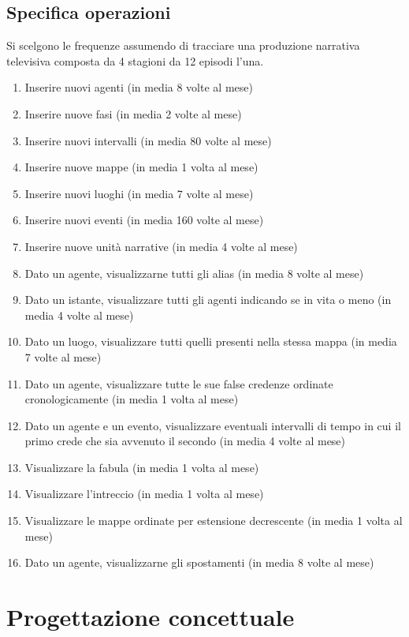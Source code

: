 \documentclass{article}
\begin{document}
\subsection{Specifica operazioni}
Si scelgono le frequenze assumendo di tracciare una produzione narrativa
televisiva composta da 4 stagioni da 12 episodi l'una.
\begin{enumerate}
	\item Inserire nuovi agenti (in media 8 volte al mese)
	\item Inserire nuove fasi (in media 2 volte al mese)
	\item Inserire nuovi intervalli (in media 80 volte al mese)
	\item Inserire nuove mappe (in media 1 volta al mese)
	\item Inserire nuovi luoghi (in media 7 volte al mese)
	\item Inserire nuovi eventi (in media 160 volte al mese)
	\item Inserire nuove unità narrative (in media 4 volte al mese)
	\item Dato un agente, visualizzarne tutti gli alias (in media 8 volte al
	      mese)
	\item Dato un istante, visualizzare tutti gli agenti indicando se in vita o
	      meno (in media 4 volte al mese)
	\item Dato un luogo, visualizzare tutti quelli presenti nella stessa mappa (in
	      media 7 volte al mese)
	\item Dato un agente, visualizzare tutte le sue false credenze ordinate
	      cronologicamente (in media 1 volta al mese)
	\item Dato un agente e un evento, visualizzare eventuali intervalli di
	      tempo in cui il primo crede che sia avvenuto il secondo (in media 4
	      volte al mese)
	\item Visualizzare la fabula (in media 1 volta al mese)
	\item Visualizzare l'intreccio (in media 1 volta al mese)
	\item Visualizzare le mappe ordinate per estensione decrescente (in media 1
	      volta al mese)
	\item Dato un agente, visualizzarne gli spostamenti (in media 8 volte al mese)
\end{enumerate}


\section{Progettazione concettuale}
\end{document}
